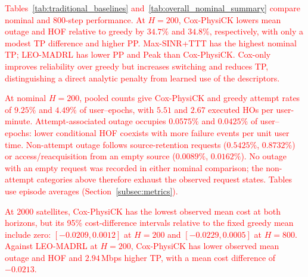 \documentclass[10pt,letterpaper,journal]{IEEEtran}
\newcommand{\revnew}[1]{\textcolor{red}{#1}}
\begin{document}
\revnew{Tables~\ref{tab:traditional_baselines} and~\ref{tab:overall_nominal_summary} compare nominal and 800-step performance. At $H=200$, Cox-PhysiCK lowers mean outage and HOF relative to greedy by $34.7\%$ and $34.8\%$, respectively, with only a modest TP difference and higher PP. Max-SINR+TTT has the highest nominal TP; LEO-MADRL has lower PP and Peak than Cox-PhysiCK. Cox-only improves reliability over greedy but increases switching and reduces TP, distinguishing a direct analytic penalty from learned use of the descriptors.}

\revnew{At nominal $H=200$, pooled counts give Cox-PhysiCK and greedy attempt rates of $9.25\%$ and $4.49\%$ of user--epochs, with $5.51$ and $2.67$ executed HOs per user-minute. Attempt-associated outage occupies $0.0575\%$ and $0.0425\%$ of user--epochs: lower conditional HOF coexists with more failure events per unit user time. Non-attempt outage follows source-retention requests ($0.5425\%$, $0.8732\%$) or access/reacquisition from an empty source ($0.0089\%$, $0.0162\%$). No outage with an empty request was recorded in either nominal comparison; the non-attempt categories above therefore exhaust the observed request states. Tables use episode averages (Section~\ref{subsec:metrics}).}

\revnew{At 2000 satellites, Cox-PhysiCK has the lowest observed mean cost at both horizons, but its 95\% cost-difference intervals relative to the fixed greedy mean include zero: $[-0.0209,0.0012]$ at $H=200$ and $[-0.0229,0.0005]$ at $H=800$. Against LEO-MADRL at $H=200$, Cox-PhysiCK has lower observed mean outage and HOF and $2.94$\,Mbps higher TP, with a mean cost difference of $-0.0213$.}
\end{document}
